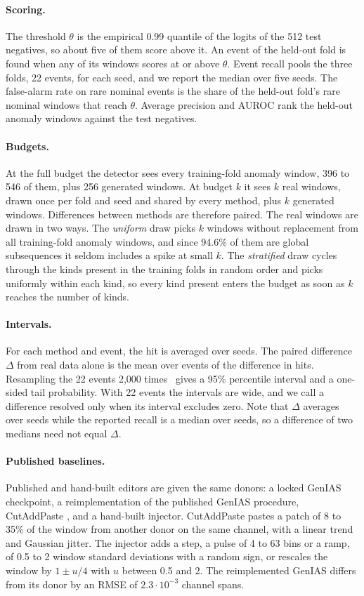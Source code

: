 \documentclass[11pt,a4paper]{article}
\begin{document}
\paragraph{Scoring.}
The threshold $\theta$ is the empirical 0.99 quantile of the logits of the 512
test negatives, so about five of them score above it. An event of the
held-out fold is found when any of its windows scores at or above $\theta$.
Event recall pools the three folds, 22 events, for each seed, and we report
the median over five seeds. The false-alarm rate on rare nominal events is the
share of the held-out fold's rare nominal windows that reach $\theta$. Average
precision and AUROC rank the held-out anomaly windows against the test
negatives.

\paragraph{Budgets.}
At the full budget the detector sees every training-fold anomaly window, 396
to 546 of them, plus 256 generated windows. At budget $k$ it sees $k$ real
windows, drawn once per fold and seed and shared by every method, plus $k$
generated windows. Differences between methods are therefore paired. The
real windows are drawn in two ways. The \emph{uniform} draw picks $k$ windows
without replacement from all training-fold anomaly windows, and since 94.6\%
of them are global subsequences it seldom includes a spike at small $k$. The
\emph{stratified} draw cycles through the kinds present in the training folds
in random order and picks uniformly within each kind, so every kind present
enters the budget as soon as $k$ reaches the number of kinds.

\paragraph{Intervals.}
For each method and event, the hit is averaged over seeds. The paired
difference $\Delta$ from real data alone is the mean over events of the
difference in hits. Resampling the 22 events 2{,}000
times~\cite{efron1994bootstrap} gives a 95\% percentile interval and a
one-sided tail probability. With 22 events the intervals are wide, and we call
a difference resolved only when its interval excludes zero. Note that $\Delta$
averages over seeds while the reported recall is a median over seeds, so a
difference of two medians need not equal $\Delta$.

\paragraph{Published baselines.}
Published and hand-built editors are given the same donors: a locked GenIAS
checkpoint, a reimplementation of the published GenIAS procedure, CutAddPaste
\cite{wang2024cutaddpaste}, and a hand-built injector. CutAddPaste pastes a
patch of 8 to 35\% of the window from another donor on the same channel, with a
linear trend and Gaussian jitter. The injector adds a step, a pulse of 4 to 63
bins or a ramp, of 0.5 to 2 window standard deviations with a random sign, or
rescales the window by $1 \pm u/4$ with $u$ between 0.5 and 2. The
reimplemented GenIAS differs from its donor by an RMSE of
$2.3 \cdot 10^{-3}$ channel spans.
\end{document}
